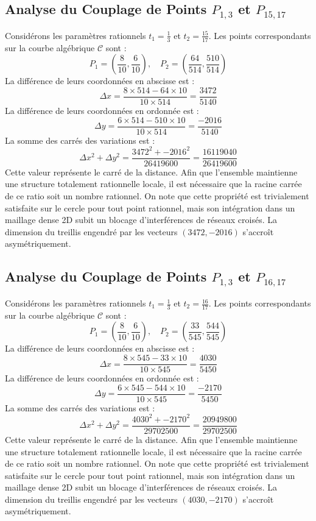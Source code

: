 \documentclass[12pt, a4paper]{article}
\begin{document}
\subsection{Analyse du Couplage de Points $P_{1,3}$ et $P_{15,17}$}
Considérons les paramètres rationnels $t_1 = \frac{1}{3}$ et $t_2 = \frac{15}{17}$.
Les points correspondants sur la courbe algébrique $\mathcal{C}$ sont :
$$ P_1 = \left( \frac{8}{10}, \frac{6}{10} \right), \quad P_2 = \left( \frac{64}{514}, \frac{510}{514} \right) $$
La différence de leurs coordonnées en abscisse est :
$$ \Delta x = \frac{8 \times 514 - 64 \times 10}{10 \times 514} = \frac{3472}{5140} $$
La différence de leurs coordonnées en ordonnée est :
$$ \Delta y = \frac{6 \times 514 - 510 \times 10}{10 \times 514} = \frac{-2016}{5140} $$
La somme des carrés des variations est :
$$ \Delta x^2 + \Delta y^2 = \frac{ 3472^2 + -2016^2 }{ 26419600 } = \frac{ 16119040 }{ 26419600 } $$
Cette valeur représente le carré de la distance. Afin que l'ensemble maintienne une structure totalement rationnelle locale, il est nécessaire que la racine carrée de ce ratio soit un nombre rationnel. On note que cette propriété est trivialement satisfaite sur le cercle pour tout point rationnel, mais son intégration dans un maillage dense 2D subit un blocage d'interférences de réseaux croisés. La dimension du treillis engendré par les vecteurs $( 3472, -2016 )$ s'accroît asymétriquement.


\subsection{Analyse du Couplage de Points $P_{1,3}$ et $P_{16,17}$}
Considérons les paramètres rationnels $t_1 = \frac{1}{3}$ et $t_2 = \frac{16}{17}$.
Les points correspondants sur la courbe algébrique $\mathcal{C}$ sont :
$$ P_1 = \left( \frac{8}{10}, \frac{6}{10} \right), \quad P_2 = \left( \frac{33}{545}, \frac{544}{545} \right) $$
La différence de leurs coordonnées en abscisse est :
$$ \Delta x = \frac{8 \times 545 - 33 \times 10}{10 \times 545} = \frac{4030}{5450} $$
La différence de leurs coordonnées en ordonnée est :
$$ \Delta y = \frac{6 \times 545 - 544 \times 10}{10 \times 545} = \frac{-2170}{5450} $$
La somme des carrés des variations est :
$$ \Delta x^2 + \Delta y^2 = \frac{ 4030^2 + -2170^2 }{ 29702500 } = \frac{ 20949800 }{ 29702500 } $$
Cette valeur représente le carré de la distance. Afin que l'ensemble maintienne une structure totalement rationnelle locale, il est nécessaire que la racine carrée de ce ratio soit un nombre rationnel. On note que cette propriété est trivialement satisfaite sur le cercle pour tout point rationnel, mais son intégration dans un maillage dense 2D subit un blocage d'interférences de réseaux croisés. La dimension du treillis engendré par les vecteurs $( 4030, -2170 )$ s'accroît asymétriquement.
\end{document}
